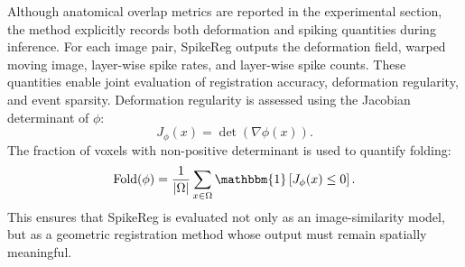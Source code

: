 
Although anatomical overlap metrics are reported in the experimental section, the method explicitly records both deformation and spiking quantities during inference. For each image pair, SpikeReg outputs the deformation field, warped moving image, layer-wise spike rates, and layer-wise spike counts. These quantities enable joint evaluation of registration accuracy, deformation regularity, and event sparsity. Deformation regularity is assessed using the Jacobian determinant of $\phi$:
\begin{equation}
    J_{\phi}(x)
    =
    \det
    \left(
    \nabla \phi(x)
    \right).
\end{equation}
The fraction of voxels with non-positive determinant is used to quantify folding:
\begin{equation}
    \mathrm{Fold}(\phi)
    =
    \frac{1}{|\Omega|}
    \sum_{x \in \Omega}
    \mathbbm{1}
    \left[
    J_{\phi}(x) \leq 0
    \right].
\end{equation}
This ensures that SpikeReg is evaluated not only as an image-similarity model, but as a geometric registration method whose output must remain spatially meaningful.